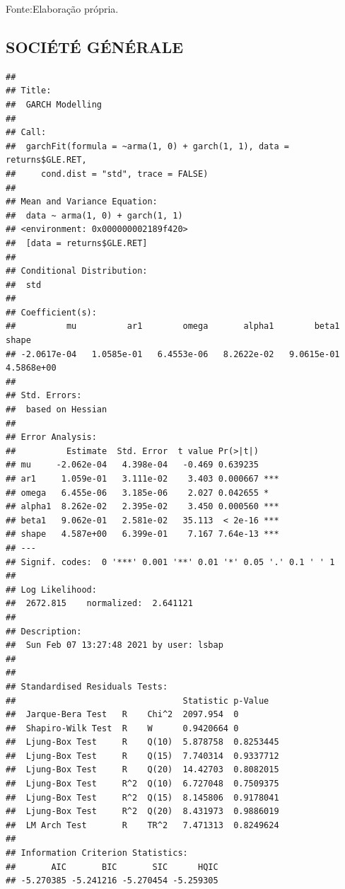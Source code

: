 \documentclass[
  12pt,
  a4paper,
  openany]{book}
\begin{document}
Fonte:Elaboração própria.

\justifying
\bigskip

\hypertarget{sociuxe9tuxe9-guxe9nuxe9rale}{%
\subsection{SOCIÉTÉ GÉNÉRALE}\label{sociuxe9tuxe9-guxe9nuxe9rale}}

\begin{verbatim}
## 
## Title:
##  GARCH Modelling 
## 
## Call:
##  garchFit(formula = ~arma(1, 0) + garch(1, 1), data = returns$GLE.RET, 
##     cond.dist = "std", trace = FALSE) 
## 
## Mean and Variance Equation:
##  data ~ arma(1, 0) + garch(1, 1)
## <environment: 0x000000002189f420>
##  [data = returns$GLE.RET]
## 
## Conditional Distribution:
##  std 
## 
## Coefficient(s):
##          mu          ar1        omega       alpha1        beta1        shape  
## -2.0617e-04   1.0585e-01   6.4553e-06   8.2622e-02   9.0615e-01   4.5868e+00  
## 
## Std. Errors:
##  based on Hessian 
## 
## Error Analysis:
##          Estimate  Std. Error  t value Pr(>|t|)    
## mu     -2.062e-04   4.398e-04   -0.469 0.639235    
## ar1     1.059e-01   3.111e-02    3.403 0.000667 ***
## omega   6.455e-06   3.185e-06    2.027 0.042655 *  
## alpha1  8.262e-02   2.395e-02    3.450 0.000560 ***
## beta1   9.062e-01   2.581e-02   35.113  < 2e-16 ***
## shape   4.587e+00   6.399e-01    7.167 7.64e-13 ***
## ---
## Signif. codes:  0 '***' 0.001 '**' 0.01 '*' 0.05 '.' 0.1 ' ' 1
## 
## Log Likelihood:
##  2672.815    normalized:  2.641121 
## 
## Description:
##  Sun Feb 07 13:27:48 2021 by user: lsbap 
## 
## 
## Standardised Residuals Tests:
##                                 Statistic p-Value  
##  Jarque-Bera Test   R    Chi^2  2097.954  0        
##  Shapiro-Wilk Test  R    W      0.9420664 0        
##  Ljung-Box Test     R    Q(10)  5.878758  0.8253445
##  Ljung-Box Test     R    Q(15)  7.740314  0.9337712
##  Ljung-Box Test     R    Q(20)  14.42703  0.8082015
##  Ljung-Box Test     R^2  Q(10)  6.727048  0.7509375
##  Ljung-Box Test     R^2  Q(15)  8.145806  0.9178041
##  Ljung-Box Test     R^2  Q(20)  8.431973  0.9886019
##  LM Arch Test       R    TR^2   7.471313  0.8249624
## 
## Information Criterion Statistics:
##       AIC       BIC       SIC      HQIC 
## -5.270385 -5.241216 -5.270454 -5.259305
\end{verbatim}
\end{document}
